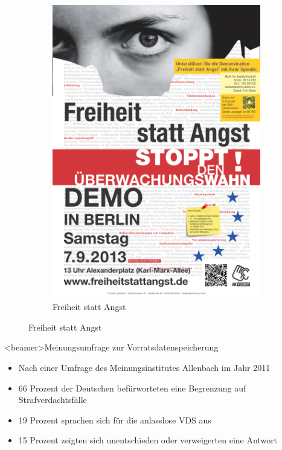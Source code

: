 \begin{frame}
\begin{figure}
\begin{subfigure}[b]{0.3\textwidth}
          \includegraphics[scale=0.05]{sections/img/freiheit_statt_angst.png}
          \caption{Freiheit statt Angst}
          \label{fig:tiger}
        \end{subfigure}
      \end{figure}
    \end{frame}
    \begin{frame}<beamer>{Meinungsumfrage zur Vorratsdatenspeicherung}
       \begin{itemize}
        \item Nach einer Umfrage des Meinungsinstitutes Allenbach im Jahr 2011
        \item 66 Prozent der Deutschen befürworteten eine Begrenzung auf Strafverdachtsfälle
        \item 19 Prozent sprachen sich für die anlasslose VDS aus
        \item 15 Prozent zeigten sich unentschieden oder verweigerten eine Antwort
      \end{itemize}
    \end{frame}

